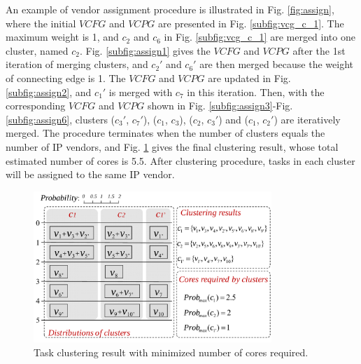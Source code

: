 \documentclass[10pt,journal]{IEEEtran}
\begin{document}
An example of vendor assignment procedure is illustrated in Fig. \ref{fig:assign}, where the initial $VCFG$ and $VCPG$ are presented in Fig. \ref{subfig:vcg_c_1}. The maximum weight is 1, and $c_2$ and $c_6$ in Fig. \ref{subfig:vcg_c_1} are merged into one cluster, named $c_2$. Fig. \ref{subfig:assign1} gives the $VCFG$ and $VCPG$ after the 1st iteration of merging clusters, and $c_2'$ and $c_6'$ are then merged because the weight of connecting edge is 1. The $VCFG$ and $VCPG$ are updated in Fig. \ref{subfig:assign2}, and $c_1'$ is merged with $c_7$ in this iteration. Then, with the corresponding $VCFG$ and $VCPG$ shown in Fig. \ref{subfig:assign3}-Fig. \ref{subfig:assign6}, clusters ($c_3'$, $c_7'$), ($c_1$, $c_3$), ($c_2$, $c_3'$) and ($c_1$, $c_2'$) are iteratively merged. The procedure terminates when the number of clusters equals the number of IP vendors, and Fig. \ref{fig:assign_result} gives the final clustering result, whose total estimated number of cores is 5.5. After clustering procedure, tasks in each cluster will be assigned to the same IP vendor.



\begin{figure}[!t]
\centering
\hspace*{-0.8em}
\includegraphics[width=9cm]{figure/vcg_result.pdf}
\caption{Task clustering result with minimized number of cores required.}
\label{fig:assign_result}
\end{figure}
\end{document}

